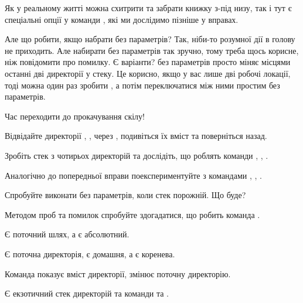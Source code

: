 Як у реальному житті можна схитрити та забрати книжку з-під низу,
так і тут є спеціальні опції у команди , які ми дослідимо пізніше у вправах.

Але що робити, якщо набрати  без параметрів?
Так, ніби-то розумної дії в голову не приходить.
Але набирати без параметрів так зручно, тому треба щось корисне, ніж повідомити про помилку.
Є варіанти?
 без параметрів просто міняє місцями останні дві директорії у стеку.
Це корисно, якщо у вас лише дві робочі локації,
тоді можна один раз зробити ,
а потім переключатися між ними простим  без параметрів.

Час переходити до прокачування скілу!

\begin{exercise}
Відвідайте директорії , ,  через ,
подивіться їх вміст та поверніться назад.
\end{exercise}

\begin{exercise}
Зробіть стек з чотирьох директорій
та дослідіть, що роблять команди , , .
\end{exercise}

\begin{exercise}
Аналогічно до попередньої вправи поекспериментуйте з командами , , .
\end{exercise}

\begin{exercise}
Спробуйте виконати  без параметрів, коли стек порожній. Що буде?
\end{exercise}

\begin{exercise}
Методом проб та помилок спробуйте здогадатися, що робить команда .
\end{exercise}

\begin{summary}
\item Є поточний шлях, а є абсолютний.
\item Є поточна директорія, є домашня, а є коренева.
\item Команда  показує вміст директорії,  змінює поточну директорію.
\item Є екзотичний стек директорій та команди  та .
\end{summary}

